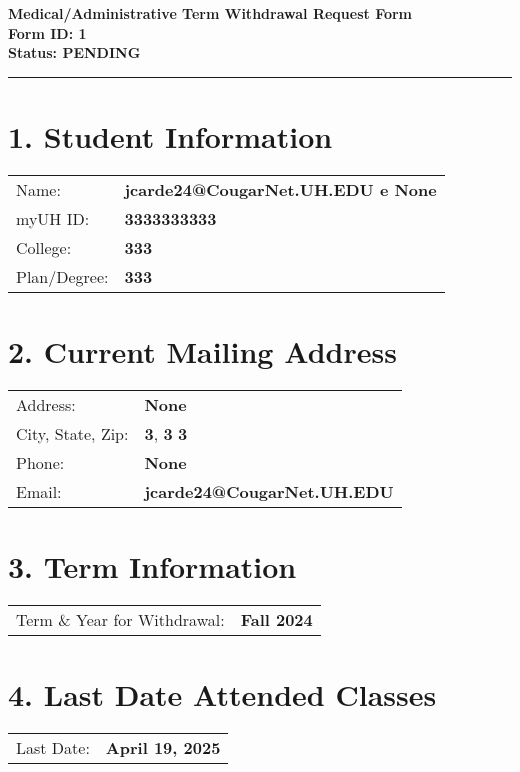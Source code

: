 \documentclass[12pt]{article}
\begin{document}
\begin{center}
  \textbf{\Large Medical/Administrative Term Withdrawal Request Form}\\[0.2cm]
  \textbf{Form ID: 1}\\[0.2cm]
  \textbf{Status: PENDING}
\end{center}

\hrule
\vspace{0.5cm}

\section*{1. Student Information}
\begin{tabular}{ll}
Name: & \textbf{jcarde24@CougarNet.UH.EDU e None} \\
myUH ID: & \textbf{3333333333} \\
College: & \textbf{333} \\
Plan/Degree: & \textbf{333} \\
\end{tabular}

\vspace{0.5cm}

\section*{2. Current Mailing Address}
\begin{tabular}{ll}
Address: & \textbf{None} \\
City, State, Zip: & \textbf{3}, \textbf{3} \textbf{3} \\
Phone: & \textbf{None} \\
Email: & \textbf{jcarde24@CougarNet.UH.EDU} \\
\end{tabular}

\vspace{0.5cm}

\section*{3. Term Information}
\begin{tabular}{ll}
Term \& Year for Withdrawal: & \textbf{Fall 2024} \\
\end{tabular}

\vspace{0.5cm}

\section*{4. Last Date Attended Classes}
\begin{tabular}{ll}
Last Date: & \textbf{April 19, 2025} \\
\end{tabular}
\end{document}
